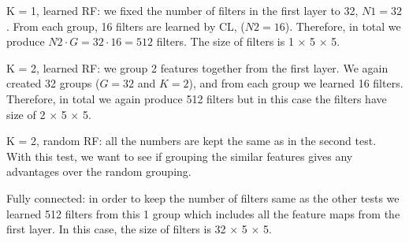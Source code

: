 \documentclass{article} %
\begin{document}
K = 1, learned RF: we fixed the number of filters in the first layer to 32, $N1=32$. From each group, 16 filters are learned by CL, ($N2 = 16$). Therefore, in total we produce $N2 \cdot G = 32 \cdot 16 = 512$ filters. The size of filters is 1 $\times$ 5 $\times$ 5. 

K = 2, learned RF: we group 2 features together from the first layer. We again created 32 groups ($G = 32$ and $K = 2$), and from each group we learned 16 filters. Therefore, in total we again produce 512 filters but in this case the filters have size of 2 $\times$ 5 $\times$ 5. 

K = 2, random RF: all the numbers are kept the same as in the second test. With this test, we want to see if grouping the similar features gives any advantages over the random grouping.

Fully connected: in order to keep the number of filters same as the other tests we learned 512 filters from this 1 group which includes all the feature maps from the first layer. In this case, the size of filters is 32 $\times$ 5 $\times$ 5. 
\end{document}
